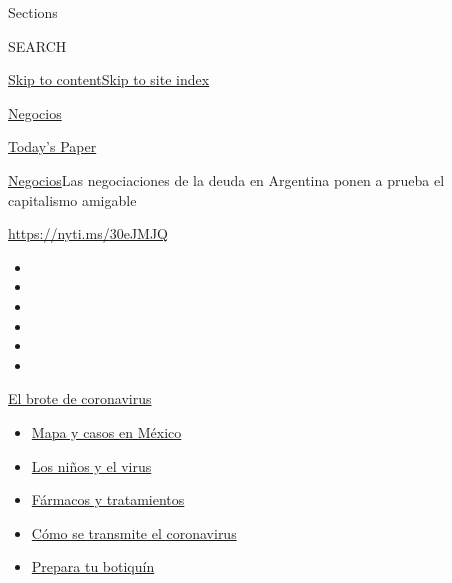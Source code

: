 Sections

SEARCH

\protect\hyperlink{site-content}{Skip to
content}\protect\hyperlink{site-index}{Skip to site index}

\href{https://www.nytimes3xbfgragh.onion/es/section/negocios}{Negocios}

\href{https://myaccount.nytimes3xbfgragh.onion/auth/login?response_type=cookie\&client_id=vi}{}

\href{https://www.nytimes3xbfgragh.onion/section/todayspaper}{Today's
Paper}

\href{/es/section/negocios}{Negocios}\textbar{}Las negociaciones de la
deuda en Argentina ponen a prueba el capitalismo amigable

\url{https://nyti.ms/30eJMJQ}

\begin{itemize}
\item
\item
\item
\item
\item
\item
\end{itemize}

\href{https://www.nytimes3xbfgragh.onion/es/spotlight/coronavirus?action=click\&pgtype=Article\&state=default\&region=TOP_BANNER\&context=storylines_menu}{El
brote de coronavirus}

\begin{itemize}
\tightlist
\item
  \href{https://www.nytimes3xbfgragh.onion/es/interactive/2020/espanol/america-latina/coronavirus-en-mexico.html?action=click\&pgtype=Article\&state=default\&region=TOP_BANNER\&context=storylines_menu}{Mapa
  y casos en México}
\item
  \href{https://www.nytimes3xbfgragh.onion/es/2020/07/31/espanol/ciencia-y-tecnologia/ninos-contagio-coronavirus.html?action=click\&pgtype=Article\&state=default\&region=TOP_BANNER\&context=storylines_menu}{Los
  niños y el virus}
\item
  \href{https://www.nytimes3xbfgragh.onion/es/interactive/2020/science/coronavirus-tratamientos-curas.html?action=click\&pgtype=Article\&state=default\&region=TOP_BANNER\&context=storylines_menu}{Fármacos
  y tratamientos}
\item
  \href{https://www.nytimes3xbfgragh.onion/es/2020/07/06/espanol/ciencia-y-tecnologia/coronavirus-transmision-aire.html?action=click\&pgtype=Article\&state=default\&region=TOP_BANNER\&context=storylines_menu}{Cómo
  se transmite el coronavirus}
\item
  \href{https://www.nytimes3xbfgragh.onion/es/2020/07/14/espanol/estilos-de-vida/botiquin-medicina-coronavirus.html?action=click\&pgtype=Article\&state=default\&region=TOP_BANNER\&context=storylines_menu}{Prepara
  tu botiquín}
\end{itemize}

